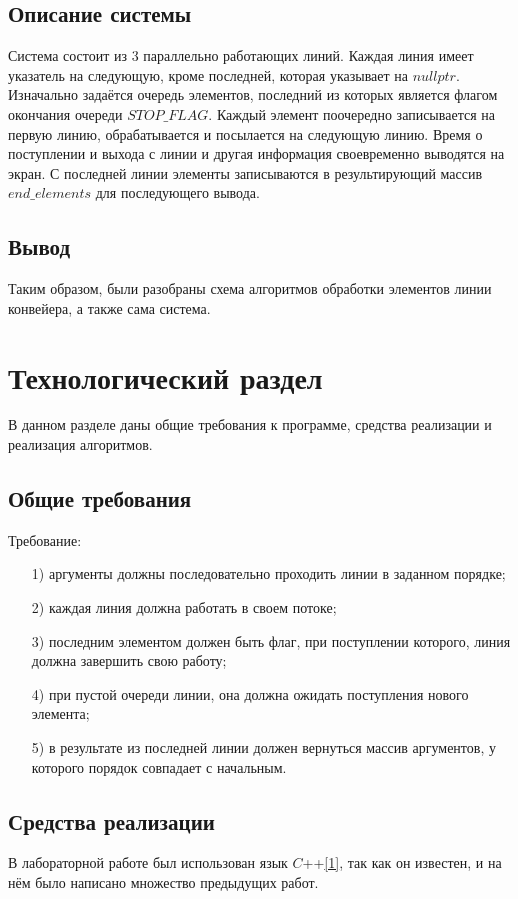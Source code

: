 \documentclass[14pt, a4paper]{extarticle}
\begin{document}
	
	\subsection{Описание системы}
	Система состоит из 3 параллельно работающих линий. Каждая линия имеет указатель на следующую, кроме последней, которая указывает на $nullptr$. Изначально задаётся очередь элементов, последний из которых является флагом окончания очереди $STOP\_FLAG$. Каждый элемент поочередно записывается на первую линию, обрабатывается и посылается на следующую линию. Время о поступлении и выхода с линии и другая информация своевременно выводятся на экран. С последней линии элементы записываются в результирующий массив $end\_elements$ для последующего вывода.  
	
	\subsection*{Вывод}
	Таким образом, были разобраны схема алгоритмов обработки элементов линии конвейера, а также сама система.
	
	\section{Технологический раздел}
	В данном разделе даны общие требования к программе, средства реализации и реализация алгоритмов.
	
	\subsection{Общие требования}
	Требование:
	\begin{enumerate}
		\item[1)] аргументы должны последовательно проходить линии в заданном порядке;
		\item[2)] каждая линия должна работать в своем потоке;
		\item[3)] последним элементом должен быть флаг, при поступлении которого, линия должна завершить свою работу;
		\item[4)] при пустой очереди линии, она должна ожидать поступления нового элемента;
		\item[5)] в результате из последней линии должен вернуться массив аргументов, у которого порядок совпадает с начальным.
	\end{enumerate}

	\subsection{Средства реализации}
	В лабораторной работе был использован язык $C$++\hyperref[CPlusPlus]{[1]}, так как он известен, и на нём было написано множество предыдущих работ.
	
\end{document}
